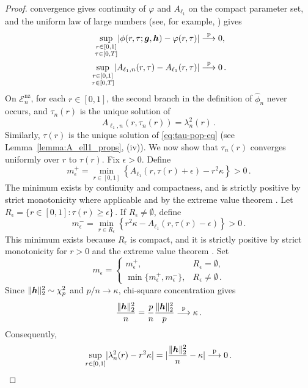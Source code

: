 \documentclass{article}
\makeatletter
\theoremstyle{definition}
\newcommand{\vnorm}[1]{%
	\ensuremath{%
		\if@display
		\left\| #1 \right\|
		\else
		\| #1 \|
		\fi
	}%
}
\newcommand{\abs}[1]{%
	\ensuremath{%
		\if@display
		\left| #1 \right|
		\else
		\lvert #1 \rvert
		\fi
	}%
}
\newcommand*{\bb}{\boldsymbol}
\def\bh{\bb{h}}
\def\bg{\bb{g}}
\makeatother
\begin{document}
\begin{bibunit}
\begin{proof}
convergence gives continuity of $\varphi$ and $A_{\ell_1}$ on the compact
parameter set, and the uniform law of large numbers
(see, for example, \citealt[][Lemma~2.4]{newey+mcfadden:1994}) gives
$$
\begin{aligned}
\underset{\substack{r\in[0,1]\\\tau\in[0,T]}}{\sup}
\abs{\phi(r,\tau;\bg,\bh)-\varphi(r,\tau)}
&\overset{\mathrm p}{\longrightarrow}0,\\
\underset{\substack{r\in[0,1]\\\tau\in[0,T]}}{\sup}
\abs{A_{\ell_1,n}(r,\tau)-A_{\ell_1}(r,\tau)}
&\overset{\mathrm p}{\longrightarrow}0\,.
\end{aligned}
$$
	On $\mathcal E_n^{\mathrm{nz}}$, for each $r\in[0,1]$, the second branch
	in the definition of $\widehat\phi_n$ never occurs, and $\tau_n(r)$ is the
	unique solution of
	$$
	A_{\ell_1,n}(r,\tau_n(r))
	=
	\lambda_n^2(r)\,.
	$$
	Similarly, $\tau(r)$ is the unique solution of
	\eqref{eq:tau-pop-eq} (see Lemma~\ref{lemma:A_ell1_props}, (iv)). We now show that $\tau_n(r)$ converges uniformly over $r$ to $\tau(r)$.
Fix $\epsilon>0$. Define
$$
    m_\epsilon^+
    =
    \underset{r\in[0,1]}{\min}
    \left\{
        A_{\ell_1}(r,\tau(r)+\epsilon)-r^2\kappa
    \right\}>0 \,.
$$
The minimum exists by continuity and compactness, and is strictly positive by
strict monotonicity where applicable and by the extreme value theorem
\citep[Theorem~4.16]{rudin+etal:1976}. Let $R_\epsilon=\{r\in[0,1]:\tau(r)\geq\epsilon\} \,.$
If $R_\epsilon\neq\emptyset$, define
$$
    m_\epsilon^-
    =
    \underset{r\in R_\epsilon}{\min}
    \left\{
        r^2\kappa-A_{\ell_1}(r,\tau(r)-\epsilon)
    \right\}>0 \,.
$$
This minimum exists because $R_\epsilon$ is compact, and it is strictly positive
by strict monotonicity for $r>0$ and the extreme value theorem
\citep[Theorem~4.16]{rudin+etal:1976}. Set
$$
    m_\epsilon
    =
    \begin{cases}
        m_\epsilon^+,
        & R_\epsilon=\emptyset,\\
        \min\{m_\epsilon^+,m_\epsilon^-\},
        & R_\epsilon\neq\emptyset\,.
    \end{cases}
$$
Since $\vnorm{\bh}_2^2\sim\chi_p^2$ and $p/n\to\kappa$, chi-square
concentration gives \citep[Equation~(3.1)]{vershynin:2018}
$$
\frac{\vnorm{\bh}_2^2}{n}
=
\frac pn\frac{\vnorm{\bh}_2^2}{p}
\overset{\mathrm p}{\longrightarrow}
\kappa\,.
$$
Consequently,
$$
\underset{r\in[0,1]}{\sup}
\abs{\lambda_n^2(r)-r^2\kappa}
=
\abs{\frac{\vnorm{\bh}_2^2}{n}-\kappa}
\overset{\mathrm p}{\longrightarrow}0\,.
$$
\end{proof}
\end{bibunit}
\end{document}

